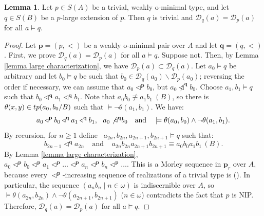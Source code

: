 \documentclass{amsart}
\theoremstyle{definition}
\newtheorem{Lemma}[Theorem]{Lemma}
\theoremstyle{definition}
\newcommand{\tp}{\mathrm{tp}}
\begin{document}
\begin{Lemma}\label{Lemma large ext of wom has equal D's}
Let $p\in S(A)$ be a trivial, weakly o-minimal type, and let $q\in S(B)$ be a $p$-large extension of $p$. Then $q$ is trivial and $\mathcal D_q(a)=\mathcal D_p(a)$ for all $a\models q$.  
\end{Lemma}
\begin{proof}
Let $\mathbf p=(p,<)$ be a weakly o-minimal pair over $A$ and let $\mathbf q=(q,<)$. First, we prove $\mathcal D_q(a)=\mathcal D_p(a)$ for all $a\models q$. Suppose not. Then, by Lemma \ref{lemma large characterization}, we have $\mathcal D_p(a)\subset\mathcal D_q(a)$. 
Let $a_0\models q$ be arbitrary and let $b_0\models q$ be such that $b_0\in\mathcal D_q(a_0)\smallsetminus\mathcal D_p(a_0)$; reversing the order if necessary, we can assume that
$a_0\triangleleft^{\mathbf p}b_0$, but $a_0\ntriangleleft^{\mathbf q}b_0$. Choose $a_1,b_1\models q$ such that $b_0\triangleleft^{\mathbf q}a_1\triangleleft^{\mathbf q}b_1$. Note that $a_0b_0\nequiv a_1b_1\ (B)$, so there is $\theta(x,y)\in\mathcal \tp(a_0,b_0/B)$ such that $\models\lnot\theta(a_1,b_1)$. We have:
\[a_0\triangleleft^{\mathbf p}b_0\triangleleft^{\mathbf q}a_1\triangleleft^{\mathbf q}b_1, \  \ a_0\not\triangleleft^{\mathbf q} b_0  \ \ \text{ and } \ \ \models\theta(a_0,b_0)\land\lnot\theta(a_1,b_1). \]
By recursion, for $n\geqslant 1$ define \ $a_{2n},b_{2n},a_{2n+1},b_{2n+1}\models q$ such that:
\[b_{2n-1}\triangleleft^{\mathbf q}a_{2n}\ \ \ \ \ \mbox{and}\ \ \ \ \ a_{2n}b_{2n}a_{2n+1}b_{2n+1}\equiv a_0b_0a_1b_1\, (B).\]
By Lemma \ref{lemma large characterization}, \ $a_0\triangleleft^{\mathbf p}b_0\triangleleft^{\mathbf p}a_1\triangleleft^{\mathbf p}\dots \triangleleft^{\mathbf p}a_n\triangleleft^{\mathbf p}b_n\triangleleft^{\mathbf p}\dots$. This is a Morley sequence in $\mathbf p_r$ over $A$, because every $\triangleleft^{\mathbf p}$-increasing sequence of realizations of a trivial type is (\cite[Lemma 5.1]{MTwqom1}). In particular, the sequence $(a_nb_n\mid n\in\omega)$ is indiscernible over $A$, so $\models\theta(a_{2n},b_{2n})\land \lnot\theta(a_{2n+1}, b_{2n+1})$ ($n\in\omega$) contradicts the fact that $p$ is NIP.
Therefore, $\mathcal D_q(a)=\mathcal D_p(a)$ for all $a\models q$.


\end{proof}
\end{document}
